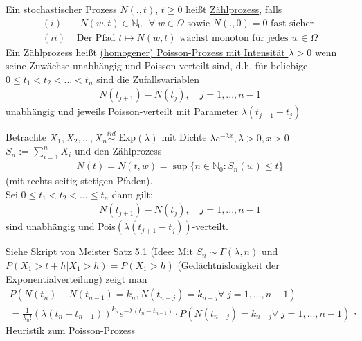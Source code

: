\documentclass[a4paper,openany]{book}
\theoremstyle{mytheoremstyle}
\theoremstyle{mytheoremstyle2}
\newtheorem*{cbew}{Beweis}
\newenvironment{bew}[1][]{%
  \ifthenelse{\boolean{showbew}}{%
    \begin{cbew}[#1]%
  }{%
    \expandafter\comment%
  }%
}{%
  \ifthenelse{\boolean{showbew}}{%
    \end{cbew}%
  }{%
    \expandafter\endcomment%
  }%
}
\begin{document}
\begin{defi}{14.3}{}
  Ein stochastischer Prozess $N(.,t)$, $t \geq 0$ heißt \underline{Zählprozess}, falls \\
  \begin{align*}
    (i)&\text{ $N(w,t)\in \mathbb{N}_0$ $\forall\;w \in \Omega $ sowie $N(.,0)=0$ fast sicher}\\
    (ii)&\text{ Der Pfad $t\mapsto N(w,t)$ wächst monoton für jedes $w \in \Omega $}
  \end{align*}
  Ein Zählprozess heißt \underline{(homogener) Poisson-Prozess mit Intensität $\lambda >0$} wenn seine Zuwächse unabhängig und Poisson-verteilt sind, d.h. für beliebige $0 \leq t_1 <t_2 <...<t_n$ sind die Zufallsvariablen 
  \begin{align*}
    N(t _{j+1})-N(t_j), \quad j=1,...,n-1
  \end{align*}
  unabhängig und jeweils Poisson-verteilt mit Parameter $\lambda (t _{j+1}-t_j)$ 
\end{defi}
\begin{theo}{14.4}{}
  Betrachte $X_1,X_2,...,X_n \overset{iid}\sim$ Exp$(\lambda )$ mit Dichte $\lambda e^{-\lambda x},\lambda >0,x>0$ \\
  $S_n:=\sum_{i=1}^{n}{X_i}$ und den Zählprozess
  \begin{align*}
    N(t)=N(t,w)=\sup \{n \in \mathbb{N}_0:S_n(w)\leq t\}
  \end{align*} (mit rechts-seitig stetigen Pfaden). \\
  Sei $0 \leq t_1<t_2<...\leq t_n$ dann gilt:
  \begin{align*}
    N(t _{j+1})-N(t_j),\quad j=1,...,n-1
  \end{align*}
  sind unabhängig und Pois$(\lambda (t _{j+1}-t_j))$-verteilt.
\end{theo}
\begin{bew}[]
  Siehe Skript von Meister Satz 5.1 (Idee: Mit $S_n\sim \Gamma (\lambda ,n)$ und $P(X_1>t+h|X_1>h)=P(X_1>h)$ (Gedächtnislosigkeit der Exponentialverteilung) zeigt man 
  \begin{multline*}
    P(N(t_n)-N(t _{n-1})=k_n,N(t _{n-j})=k _{n-j}\forall\;j=1,...,n-1)\\=\frac{1}{k_n!}(\lambda (t _{n}-t _{n-1}))^{k_n}e^{-\lambda (t _n-t _{n-1})}\cdot P(N(t _{n-j})=k _{n-j}\forall\;j=1,...,n-1)\;\square
  \end{multline*}
\end{bew}
\noindent \underline{Heuristik zum Poisson-Prozess} 
\end{document}
